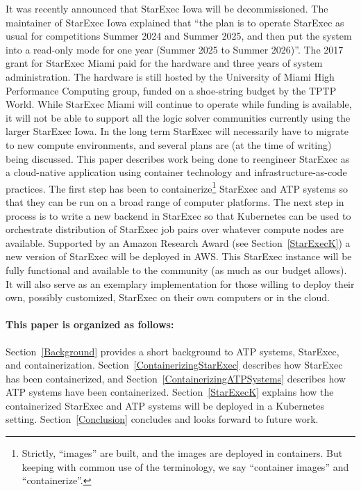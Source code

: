 \documentclass{easychair}
\begin{document}
It was recently announced that StarExec Iowa will be decommissioned. 
The maintainer of StarExec Iowa explained that ``the plan is to operate StarExec as usual for 
competitions Summer 2024 and Summer 2025, and then put the system into a read-only mode for one 
year (Summer 2025 to Summer 2026)''.
The 2017 grant for StarExec Miami paid for the hardware and three years of system administration.
The hardware is still hosted by the University of Miami High Performance Computing group,
funded on a shoe-string budget by the TPTP World.
While StarExec Miami will continue to operate while funding is available, it will not be able
to support all the logic solver communities currently using the larger StarExec Iowa.
In the long term StarExec will necessarily have to migrate to new compute environments, and 
several plans are (at the time of writing) being discussed.
This paper describes work being done to reengineer StarExec as a cloud-native application using
container technology and infrastructure-as-code practices.
The first step has been to containerize\footnote{%
Strictly, ``images'' are built, and the images are deployed in containers. 
But keeping with common use of the terminology, we say ``container images'' and ``containerize''.} 
StarExec and ATP systems so that they can be run on a broad range of computer platforms.
The next step in process is to write a new backend in StarExec so that Kubernetes can be used to
orchestrate distribution of StarExec job pairs over whatever compute nodes are available.
Supported by an Amazon Research Award (see Section~\ref{StarExecK}) a new version of StarExec
will be deployed in AWS.
This StarExec instance will be fully functional and available to the community (as much as our 
budget allows). 
It will also serve as an exemplary implementation for those willing to deploy their own, possibly 
customized, StarExec on their own computers or in the cloud.

\paragraph{This paper is organized as follows:}
Section~\ref{Background} provides a short background to ATP systems, StarExec, and 
containerization.
Section~\ref{ContainerizingStarExec} describes how StarExec has been containerized, and
Section~\ref{ContainerizingATPSystems} describes how ATP systems have been containerized.
Section~\ref{StarExecK} explains how the containerized StarExec and ATP systems will be deployed 
in a Kubernetes setting.
Section~\ref{Conclusion} concludes and looks forward to future work.
\end{document}
